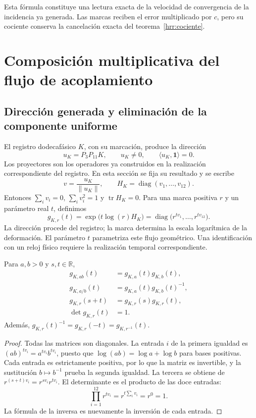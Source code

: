 Esta fórmula constituye una lectura exacta de la velocidad de convergencia
de la incidencia ya generada. Las marcas reciben el error multiplicado
por \(c\), pero su cociente conserva la cancelación exacta del
teorema~\ref{hrr:cociente}.

\section{Composición multiplicativa del flujo de acoplamiento}
\label{hrr:flujo}

\subsection{Dirección generada y eliminación de la componente uniforme}

El registro dodecafásico \(K\), con su marcación, produce la dirección
\[
 u_K=P_3P_{11}K,\qquad u_K\neq0,\qquad
 \langle u_K,\mathbf1\rangle=0.
\]
Los proyectores son los operadores ya construidos en la realización
correspondiente del registro. En esta sección se fija su resultado y
se escribe
\[
 v=\frac{u_K}{\|u_K\|},\qquad
 H_K=\operatorname{diag}(v_1,\ldots,v_{12}).
\]
Entonces \(\sum_i v_i=0\), \(\sum_i v_i^2=1\) y
\(\operatorname{tr}H_K=0\). Para una marca positiva \(r\) y un
parámetro real \(t\), definimos
\begin{equation}
 g_{K,r}(t)=\exp\bigl(t\log(r)H_K\bigr)
 =\operatorname{diag}\bigl(r^{tv_1},\ldots,r^{tv_{12}}\bigr).
 \label{hrr:g-definicion}
\end{equation}
La dirección procede del registro; la marca determina la escala
logarítmica de la deformación. El parámetro \(t\) parametriza este
flujo geométrico. Una identificación con un reloj físico requiere la
realización temporal correspondiente.

\begin{theorem}
\label{hrr:homomorfismo}
Para \(a,b>0\) y \(s,t\in\mathbb R\),
\begin{align}
 g_{K,ab}(t)&=g_{K,a}(t)g_{K,b}(t),
 \label{hrr:producto}\\
 g_{K,a/b}(t)&=g_{K,a}(t)g_{K,b}(t)^{-1},
 \label{hrr:cociente-flujo}\\
 g_{K,r}(s+t)&=g_{K,r}(s)g_{K,r}(t),
 \label{hrr:grupo-t}\\
 \det g_{K,r}(t)&=1.
 \label{hrr:determinante}
\end{align}
Además, \(g_{K,r}(t)^{-1}=g_{K,r}(-t)=g_{K,r^{-1}}(t)\).
\end{theorem}
\begin{proof}
Todas las matrices son diagonales. La entrada \(i\) de la primera
igualdad es \((ab)^{tv_i}=a^{tv_i}b^{tv_i}\), puesto que
\(\log(ab)=\log a+\log b\) para bases positivas. Cada entrada
es estrictamente positiva, por lo que la matriz es invertible, y
la sustitución \(b\mapsto b^{-1}\) prueba la segunda igualdad.
La tercera se obtiene de \(r^{(s+t)v_i}=r^{sv_i}r^{tv_i}\).
El determinante es el producto de las doce entradas:
\[
 \prod_{i=1}^{12}r^{tv_i}
 =r^{t\sum_i v_i}=r^0=1.
\]
La fórmula de la inversa es nuevamente la inversión de cada entrada.
\end{proof}

